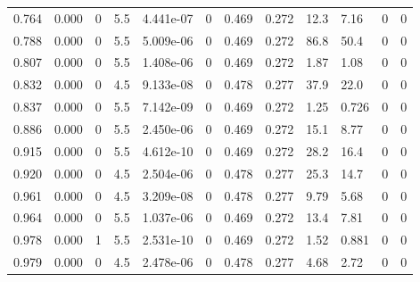 \documentclass[preview]{standalone}
\begin{document}
{{\begin{tabular}{L{1.2cm}C{1.2cm} C{0.3cm}C{0.5cm} C{1.4cm}C{1.4cm} C{1.4cm}C{1.4cm} C{1.6cm}C{1.6cm} C{1.6cm}C{1.6cm}}
  0.764  &  0.000  & 0     & 5.5 &  4.441e-07  & 0  &  0.469&   0.272& 12.3 & 7.16   &  0 & 0  \\ 
  0.788  &  0.000  & 0     & 5.5 &  5.009e-06  & 0  &  0.469&   0.272& 86.8 & 50.4   &  0 & 0  \\ 
  0.807  &  0.000  & 0     & 5.5 &  1.408e-06  & 0  &  0.469&   0.272& 1.87 & 1.08   &  0 & 0  \\ 
  0.832  &  0.000  & 0     & 4.5 &  9.133e-08  & 0  &  0.478&   0.277& 37.9 & 22.0   &  0 & 0  \\ 
  0.837  &  0.000  & 0     & 5.5 &  7.142e-09  & 0  &  0.469&   0.272& 1.25 & 0.726   &  0 & 0  \\ 
  0.886  &  0.000  & 0     & 5.5 &  2.450e-06  & 0  &  0.469&   0.272& 15.1 & 8.77   &  0 & 0  \\ 
  0.915  &  0.000  & 0     & 5.5 &  4.612e-10  & 0  &  0.469&   0.272& 28.2 & 16.4   &  0 & 0  \\ 
  0.920  &  0.000  & 0     & 4.5 &  2.504e-06  & 0  &  0.478&   0.277& 25.3 & 14.7   &  0 & 0  \\ 
  0.961  &  0.000  & 0     & 4.5 &  3.209e-08  & 0  &  0.478&   0.277& 9.79 & 5.68   &  0 & 0  \\ 
  0.964  &  0.000  & 0     & 5.5 &  1.037e-06  & 0  &  0.469&   0.272& 13.4 & 7.81   &  0 & 0  \\ 
  0.978  &  0.000  & 1     & 5.5 &  2.531e-10  & 0  &  0.469&   0.272& 1.52 & 0.881   &  0 & 0  \\ 
  0.979  &  0.000  & 0     & 4.5 &  2.478e-06  & 0  &  0.478&   0.277& 4.68 & 2.72   &  0 & 0  \\ 
\hline 
\end{tabular} 

}}
\end{document}
